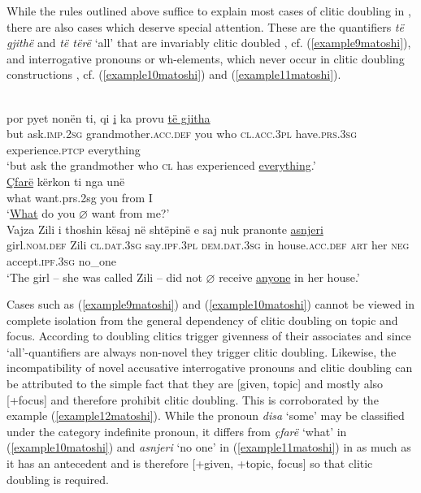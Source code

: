 \documentclass[output=paper]{langsci/langscibook}
\begin{document}
While the rules outlined above suffice to explain most cases of clitic doubling in , there are also cases which deserve special attention. These are the quantifiers \textit{të gjithë} and \textit{të tërë} ‘all’ that are invariably clitic doubled \citep{Kallulli2016}, cf. (\ref{example9matoshi}), and interrogative pronouns or wh-elements, which never occur in clitic doubling constructions \citep[220]{Kallulli2000}, cf. (\ref{example10matoshi}) and (\ref{example11matoshi}).\largerpage


\ea \label{example9matoshi}
	\\
	\gll por pyet nonën ti, qi \uline{i} ka provu \uline{të gjitha}\\
	but ask\textsc{.imp.2sg} grandmother.\textsc{acc.def} you who \textsc{cl.acc.3pl} have\textsc{.prs.3sg} experience.\textsc{ptcp} everything\\	
	\glt ‘but ask the grandmother who \textsc{cl} has experienced \uline{everything}.’	
\ex \label{example10matoshi}
	\\
	\gll \uline{Çfarë} kërkon ti nga unë\\	
	what want.prs.2sg you from I\\	
	\glt ‘\uline{What} do you $\varnothing$ want from me?’
\ex \label{example11matoshi}
	\\
	\gll Vajza Zili i thoshin kësaj në shtëpinë e saj nuk pranonte \uline{asnjeri} \\
	girl.\textsc{nom.def} Zili \textsc{cl.dat.3sg} say\textsc{.ipf.3pl} \textsc{dem.dat.3sg} in house\textsc{.acc.def} \textsc{art} her \textsc{neg} accept\textsc{.ipf.3sg} no\_one\\
	\glt ‘The girl -- she was called Zili -- did not $\varnothing$ receive \uline{anyone} in her house.’
\z

Cases such as (\ref{example9matoshi}) and (\ref{example10matoshi}) cannot be viewed in complete isolation from the general dependency of clitic doubling on topic and focus. According to \citet{Kallulli2016} doubling clitics trigger givenness of their associates and since ‘all’-quantifiers are always non-novel they trigger clitic doubling. Likewise, the incompatibility of novel accusative interrogative pronouns and clitic doubling can be attributed to the simple fact that they are [\textminus{}given, \textminus{}topic] and mostly also [+focus] and therefore prohibit clitic doubling. This is corroborated by the example (\ref{example12matoshi}). While the pronoun \textit{disa} ‘some’ may be classified under the category indefinite pronoun, it differs from \textit{çfarë} ‘what’ in (\ref{example10matoshi}) and \textit{asnjeri} ‘no one’ in (\ref{example11matoshi}) in as much as it has an antecedent and is therefore [+given, +topic, \textminus{}focus] so that clitic doubling is required.  
\end{document}
